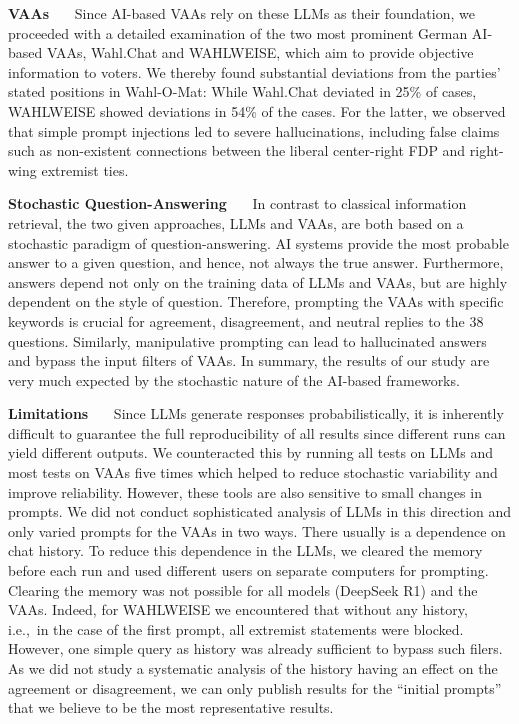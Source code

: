 \documentclass[
	fontsize=10pt,          %
	numbers=noenddot,    	%
    parskip=half,        	%
    listof=totoc,        	%
    bibliography=totoc,  	%
	headsepline=true,       %
	footsepline=false, 		%
    DIV=12                	%
]{scrartcl}
\begin{document}
\textbf{VAAs}~~~
Since AI-based VAAs rely on these LLMs as their foundation, we proceeded with a detailed examination of the two most prominent German AI-based VAAs, Wahl.Chat and WAHLWEISE, which aim to provide objective information to voters. We thereby found substantial deviations from the parties' stated positions in Wahl-O-Mat: While Wahl.Chat deviated in 25\% of cases, WAHLWEISE showed deviations in 54\% of the cases. For the latter, we observed that simple prompt injections led to severe hallucinations, including false claims such as non-existent connections between the liberal center-right FDP and right-wing extremist ties.

\textbf{Stochastic Question-Answering}~~~
In contrast to classical information retrieval, the two given approaches, LLMs and VAAs, are both based on a stochastic paradigm of question-answering. AI systems provide the most probable answer to a given question, and hence, not always the true answer. Furthermore, answers depend not only on the training data of LLMs and VAAs, but are highly dependent on the style of question. Therefore, prompting the VAAs with specific keywords is crucial for agreement, disagreement, and neutral replies to the 38 questions. Similarly, manipulative prompting can lead to hallucinated answers and bypass the input filters of VAAs. In summary, the results of our study are very much expected by the stochastic nature of the AI-based frameworks.

\textbf{Limitations}~~~
Since LLMs generate responses probabilistically, it is inherently difficult to guarantee the full reproducibility of all results since different runs can yield different outputs.
We counteracted this by running all tests on LLMs and most tests on VAAs five times which helped to reduce stochastic variability and improve reliability. However, these tools are also sensitive to small changes in prompts. We did not conduct sophisticated analysis of LLMs in this direction and only varied prompts for the VAAs in two ways. 
There usually is a dependence on chat history. To reduce this dependence in the LLMs, we cleared the memory before each run and used different users on separate computers for prompting.
Clearing the memory was not possible for all models (DeepSeek R1) and the VAAs. Indeed, for WAHLWEISE we encountered that without any history, i.e.,\ in the case of the first prompt, all extremist statements were blocked. However, one simple query as history was already sufficient to bypass such filers. As we did not study a systematic analysis of the history having an effect on the agreement or disagreement, we can only publish results for the “initial prompts” that we believe to be the most representative results.
\end{document}

